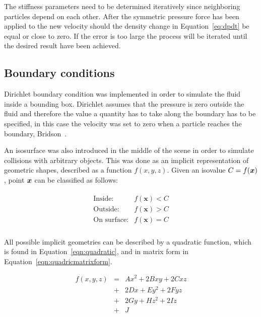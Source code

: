     The stiffness parameters need to be determined iteratively since neighboring particles depend on each other.
    After the symmetric pressure force has been applied to the new velocity should the density change in Equation~\ref{eq:dpdt} be equal or close to zero.
    If the error is too large the process will be iterated until the desired result have been achieved.


\subsection{Boundary conditions}
Dirichlet boundary condition was implemented in order to simulate the fluid inside a bounding box.
Dirichlet assumes that the pressure is zero outside the fluid and therefore the value a quantity has to take along the boundary has to be specified, in this case the velocity was set to zero when a particle reaches the boundary, Bridson~\cite{bridson}.

An isosurface was also introduced in the middle of the scene in order to simulate collisions with arbitrary objects.
This was done as an implicit representation of geometric shapes, described as a function $f(x,y,z)$.
Given an isovalue $C = f(\bm{x})$, point $\bm{x}$ can be classified as follows:

\begin{eqnarray} \label{eq:classifications}
\begin{array}{ll}
 \mbox{Inside:} & f(\mathbf{x}) < C \\
 \mbox{Outside:} & f(\mathbf{x}) > C \\
 \mbox{On surface:} & f(\mathbf{x}) = C \\  
  \end{array}
\end{eqnarray}

All possible implicit geometries can be described by a quadratic function, which is found in Equation~\ref{eqn:quadratic}, and in matrix form in Equation~\ref{eqn:quadricmatrixform}.

\begin{eqnarray}
\label{eqn:quadratic}
f(x,y,z) &=
\nonumber & Ax^2+2Bxy+2Cxz\\
 &+&2Dx+Ey^2+2Fyz\\
\nonumber &+&2Gy+Hz^2+2Iz\\
\nonumber &+&J
\end{eqnarray}

